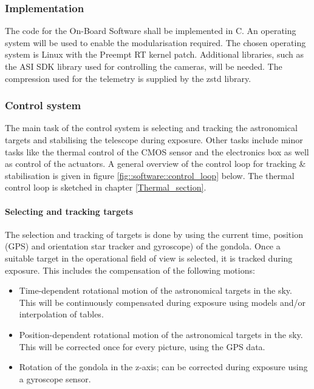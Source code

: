 \subsubsection{Implementation}

The code for the On-Board Software shall be implemented in C. An operating system will be used to enable the modularisation required. The chosen operating system is Linux with the Preempt RT kernel patch. Additional libraries, such as the ASI SDK library used for controlling the cameras, will be needed. The compression used for the telemetry is supplied by the zstd library.



\subsubsection{Control system}
The main task of the control system is selecting and tracking the astronomical targets and stabilising the telescope during exposure. Other tasks include minor tasks like the thermal control of the CMOS sensor and the electronics box as well as control of the actuators. A general overview of the control loop for tracking \& stabilisation is given in figure  \mbox{\ref{fig::software::control_loop}} below. The thermal control loop is sketched in chapter \mbox{\ref{Thermal_section}}.

\paragraph{Selecting and tracking targets}

The selection and tracking of targets is done by using the current time, position (GPS) and orientation star tracker and gyroscope) of the gondola. Once a suitable target in the operational field of view is selected, it is tracked during exposure. This includes the compensation of the following motions:
\begin{itemize}
	\item Time-dependent rotational motion of the astronomical targets in the sky. This will be continuously compensated during exposure using models and/or interpolation of tables.
	\item Position-dependent rotational motion of the astronomical targets in the sky. This will be corrected once for every picture, using the GPS data.
	\item Rotation of the gondola in the z-axis; can be corrected during exposure using a gyroscope sensor.
\end{itemize}

